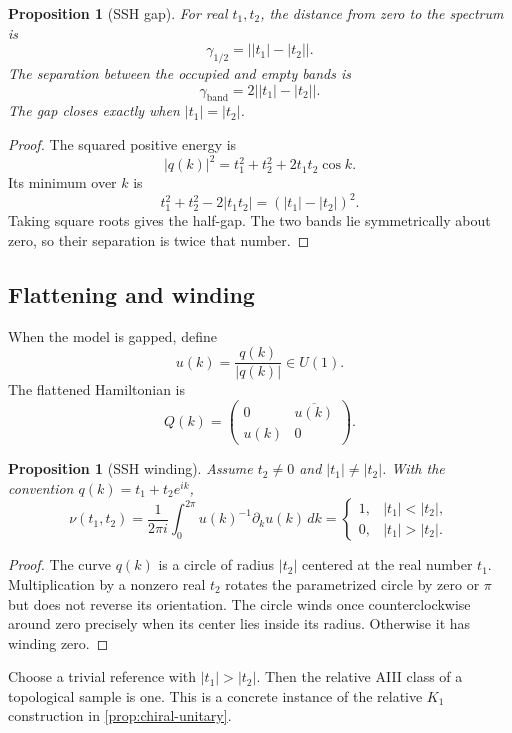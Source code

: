 \documentclass[12pt]{article}
\newtheorem{proposition}[theorem]{Proposition}
\theoremstyle{definition}
\theoremstyle{remark}
\begin{document}
\begin{proposition}[SSH gap]
\label{prop:ssh-gap}
For real $t_1,t_2$, the distance from zero to the spectrum is
\[
\gamma_{1/2}
=
\bigl||t_1|-|t_2|\bigr|.
\]
The separation between the occupied and empty bands is
\[
\gamma_{\mathrm{band}}
=
2\bigl||t_1|-|t_2|\bigr|.
\]
The gap closes exactly when $|t_1|=|t_2|$.
\end{proposition}

\begin{proof}
The squared positive energy is
\[
|q(k)|^2
=
t_1^2+t_2^2+2t_1t_2\cos k.
\]
Its minimum over $k$ is
\[
t_1^2+t_2^2-2|t_1t_2|
=
(|t_1|-|t_2|)^2.
\]
Taking square roots gives the half-gap.
The two bands lie symmetrically about zero, so their separation is twice that
number.
\end{proof}

\subsection{Flattening and winding}

When the model is gapped, define
\[
u(k)=\frac{q(k)}{|q(k)|}\in U(1).
\]
The flattened Hamiltonian is
\[
Q(k)
=
\begin{pmatrix}
0&\overline{u(k)}\\
u(k)&0
\end{pmatrix}.
\]

\begin{proposition}[SSH winding]
\label{prop:ssh-winding}
Assume $t_2\neq0$ and $|t_1|\neq|t_2|$.
With the convention $q(k)=t_1+t_2e^{ik}$,
\[
\nu(t_1,t_2)
=
\frac{1}{2\pi i}
\int_0^{2\pi}u(k)^{-1}\partial_ku(k)\,dk
=
\begin{cases}
1,&|t_1|<|t_2|,\\
0,&|t_1|>|t_2|.
\end{cases}
\]
\end{proposition}

\begin{proof}
The curve $q(k)$ is a circle of radius $|t_2|$ centered at the real number
$t_1$.
Multiplication by a nonzero real $t_2$ rotates the parametrized circle by
zero or $\pi$ but does not reverse its orientation.
The circle winds once counterclockwise around zero precisely when its center
lies inside its radius.
Otherwise it has winding zero.
\end{proof}

Choose a trivial reference with $|t_1|>|t_2|$.
Then the relative AIII class of a topological sample is one.
This is a concrete instance of the relative $K_1$ construction in
\cref{prop:chiral-unitary}.
\end{document}
